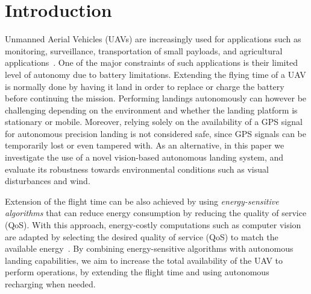 \documentclass[conference]{IEEEtran}
\begin{document}
%
\IEEEpeerreviewmaketitle

\section{Introduction}
\label{sec:introduction}

Unmanned Aerial Vehicles (UAVs) are increasingly used for applications such as monitoring, surveillance, transportation of small payloads, and agricultural applications~\cite{costa2012use,salami2014uav}. 
%
One of the major constraints of such applications is their limited level of autonomy due to battery limitations. %
Extending the flying time of a UAV is normally done by having it land in order to replace or charge the battery before continuing the mission. Performing landings autonomously can however be challenging depending on the environment and whether the landing platform is stationary or mobile.
%
%
Moreover, relying solely on the availability of a GPS signal for autonomous precision landing is not considered safe, since GPS signals can be temporarily lost or even tampered with. %
As an alternative, in this paper we investigate the use of a novel vision-based autonomous landing system, and evaluate its robustness towards environmental conditions such as visual disturbances and wind. %

Extension of the flight time can be also achieved by using \emph{energy-sensitive algorithms} that can reduce energy consumption by reducing the quality of service (QoS). With this approach, energy-costly computations such as computer vision are adapted by selecting the desired quality of service (QoS) to match the available energy~\cite{seewald2020mechanical}. %
By combining energy-sensitive algorithms with autonomous landing capabilities, we aim to increase the total availability of the UAV to perform operations, by extending the flight time and using autonomous recharging when needed.
\end{document}
